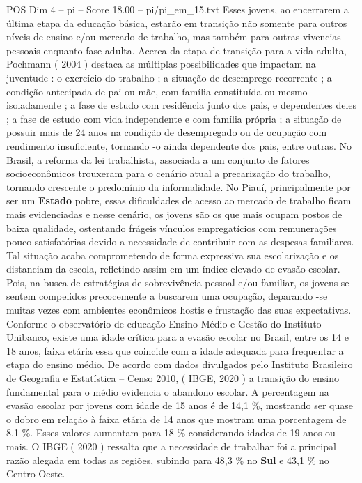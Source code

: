 \begin{textsample}{POS Dim 4 – pi – Score 18.00 – pi/pi\_em\_15.txt}
Esses jovens, ao encerrarem a última etapa da educação básica, estarão em transição não somente para outros níveis de ensino e/ou mercado de trabalho, mas também para outras vivencias pessoais enquanto fase adulta.
Acerca da etapa de transição para a vida adulta, Pochmann ( 2004 ) destaca as múltiplas possibilidades que impactam na juventude : o exercício do trabalho ; a situação de desemprego recorrente ; a condição antecipada de pai ou mãe, com família constituída ou mesmo isoladamente ; a fase de estudo com residência junto dos pais, e dependentes deles ; a fase de estudo com vida independente e com família própria ; a situação de possuir mais de 24 anos na condição de desempregado ou de ocupação com rendimento insuficiente, tornando -o ainda dependente dos pais, entre outras.
No Brasil, a reforma da lei trabalhista, associada a um conjunto de fatores socioeconômicos trouxeram para o cenário atual a precarização do trabalho, tornando crescente o predomínio da informalidade.
No Piauí, principalmente por ser um \textbf{Estado} pobre, essas dificuldades de acesso ao mercado de trabalho ficam mais evidenciadas e nesse cenário, os jovens são os que mais ocupam postos de baixa qualidade, ostentando frágeis vínculos empregatícios com remunerações pouco satisfatórias devido a necessidade de contribuir com as despesas familiares.
Tal situação acaba comprometendo de forma expressiva sua escolarização e os distanciam da escola, refletindo assim em um índice elevado de evasão escolar.
Pois, na busca de estratégias de sobrevivência pessoal e/ou familiar, os jovens se sentem compelidos precocemente a buscarem uma ocupação, deparando -se muitas vezes com ambientes econômicos hostis e frustação das suas expectativas.
Conforme o observatório de educação Ensino Médio e Gestão do Instituto Unibanco, existe uma idade crítica para a evasão escolar no Brasil, entre os 14 e 18 anos, faixa etária essa que coincide com a idade adequada para frequentar a etapa do ensino médio.
De acordo com dados divulgados pelo Instituto Brasileiro de Geografia e Estatística – Censo 2010, ( IBGE, 2020 ) a transição do ensino fundamental para o médio evidencia o abandono escolar.
A percentagem na evasão escolar por jovens com idade de 15 anos é de 14,1 \%, mostrando ser quase o dobro em relação à faixa etária de 14 anos que mostram uma porcentagem de 8,1 \%.
Esses valores aumentam para 18 \% considerando idades de 19 anos ou mais.
O IBGE ( 2020 ) ressalta que a necessidade de trabalhar foi a principal razão alegada em todas as regiões, subindo para 48,3 \% no \textbf{Sul} e 43,1 \% no Centro-Oeste.

\end{textsample}
